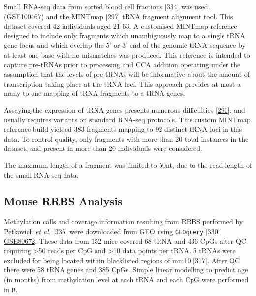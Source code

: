 \documentclass[
]{book}
\begin{document}
Small RNA-seq data from sorted blood cell fractions {[}\protect\hyperlink{ref-Juzenas2017}{334}{]} was used. (\href{https://www.ncbi.nlm.nih.gov/geo/query/acc.cgi?acc=GSE100467}{GSE100467}) and the MINTmap {[}\protect\hyperlink{ref-Loher2017}{297}{]} tRNA fragment alignment tool.
This dataset covered 42 individuals aged 21-63.
A customised MINTmap reference designed to include only fragments which unambiguously map to a single tRNA gene locus and which overlap the 5' or 3' end of the genomic tRNA sequence by at least one base with no mismatches was produced.
This reference is intended to capture pre-tRNAs prior to processing and CCA addition operating under the assumption that the levels of pre-tRNAs will be informative about the amount of transcription taking place at the tRNA loci.
This approach provides at most a many to one mapping of tRNA fragments to a tRNA genes.

Assaying the expression of tRNA genes presents numerous difficulties {[}\protect\hyperlink{ref-Torres2019}{291}{]}, and usually requires variants on standard RNA-seq protocols.
This custom MINTmap reference build yielded 383 fragments mapping to 92 distinct tRNA loci in this data.
To control quality, only fragments with more than 20 total instances in the dataset, and present in more than 20 individuals were considered.

The maximum length of a fragment was limited to 50nt, due to the read length of the small RNA-seq data.

\hypertarget{mousemethods}{%
\subsection{Mouse RRBS Analysis}\label{mousemethods}}

Methylation calls and coverage information resulting from RRBS performed by Petkovich \emph{et al.} {[}\protect\hyperlink{ref-Petkovich2017}{335}{]} were downloaded from GEO using \texttt{GEOquery} {[}\protect\hyperlink{ref-Davis2007p}{330}{]} \href{https://www.ncbi.nlm.nih.gov/geo/query/acc.cgi?acc=GSE80672}{GSE80672}.
These data from 152 mice covered 68 tRNA and 436 CpGs after QC requiring \textgreater50 reads per CpG and \textgreater10 data points per tRNA.
5 tRNAs were excluded for being located within blacklisted regions of mm10 {[}\protect\hyperlink{ref-Amemiya2019}{317}{]}.
After QC there were 58 tRNA genes and 385 CpGs.
Simple linear modelling to predict age (in months) from methylation level at each tRNA and each CpG were performed in \texttt{R}.
\end{document}
